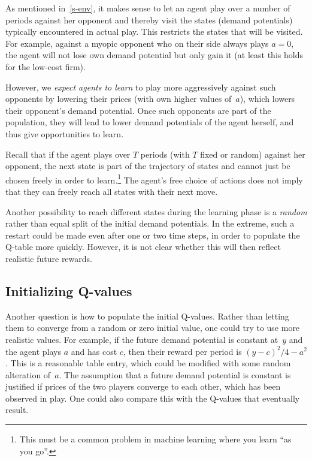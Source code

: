 \documentclass[a4paper,12pt]{article}  %
\theoremstyle{definition}
\begin{document}
As mentioned in~\ref{s-env}, it makes sense to let an agent
play over a number of periods against her opponent and
thereby visit the states (demand potentials) typically
encountered in actual play.
This restricts the states that will be visited.
For example, against a myopic opponent who on their side
always plays $a=0$, the agent will not lose own demand
potential but only gain it (at least this holds for the
low-cost firm).

However, we \textit{expect agents to learn} to play more
aggressively against such opponents by lowering their prices
(with own higher values of~$a$), which lowers their
opponent's demand potential.
Once such opponents are part of the population, they will
lead to lower demand potentials of the agent herself, and
thus give opportunities to learn.

Recall that if the agent plays over $T$ periods (with $T$
fixed or random) against her opponent, the next state is
part of the trajectory of states and cannot just be chosen
freely in order to learn.\footnote{This must be a common
problem in machine learning where you learn ``as you go''.}
The agent's free choice of actions does not imply that they
can freely reach all states with their next move.

Another possibility to reach different states during the
learning phase is a \textit{random} rather than equal split
of the initial demand potentials.
In the extreme, such a restart could be made even after one
or two time steps, in order to populate the Q-table more
quickly.
However, it is not clear whether this will then reflect
realistic future rewards. 

\subsection{Initializing Q-values}

Another question is how to populate the initial Q-values.
Rather than letting them to converge from a random or zero
initial value, one could try to use more realistic values.
For example, if the future demand potential is constant at~$y$
and the agent plays $a$ and has cost $c$, then their reward
per period is $(y-c)^2/4-a^2$.
This is a reasonable table entry, which could be modified
with some random alteration of~$a$.
The assumption that a future demand potential is constant is
justified if prices of the two players converge to each
other, which has been observed in play.
One could also compare this with the Q-values that
eventually result.
\end{document}
